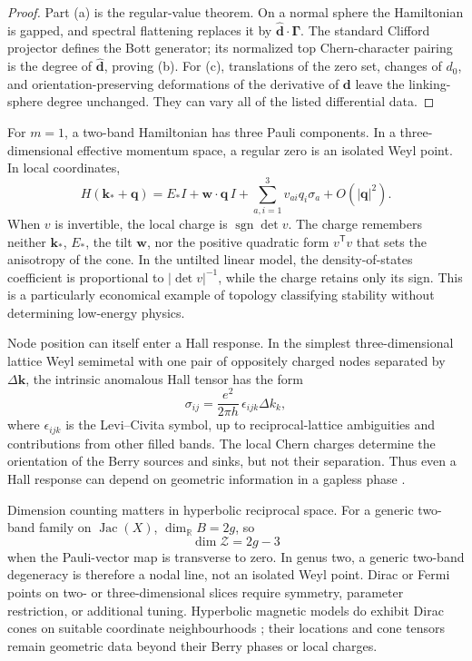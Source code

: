 \documentclass[11pt]{article}
\theoremstyle{definition}
\theoremstyle{remark}
\newcommand{\RR}{\mathbb R}
\newcommand{\Jac}{\operatorname{Jac}}
\begin{document}
\begin{proof}
Part \textup{(a)} is the regular-value theorem.  On a normal sphere the
Hamiltonian is gapped, and spectral flattening replaces it by
\(\widehat{\bm d}\cdot\bm\Gamma\).  The standard Clifford projector defines
the Bott generator; its normalized top Chern-character pairing is the degree
of \(\widehat{\bm d}\), proving \textup{(b)}.  For \textup{(c)}, translations
of the zero set, changes of \(d_0\), and orientation-preserving deformations
of the derivative of \(\bm d\) leave the linking-sphere degree unchanged.
They can vary all of the listed differential data.
\end{proof}

For \(m=1\), a two-band Hamiltonian has three Pauli components.  In a
three-dimensional effective momentum space, a regular zero is an isolated
Weyl point.  In local coordinates,
\[
 H(\bm k_*+\bm q)
   =E_*I+\bm w\cdot\bm q\,I
      +\sum_{a,i=1}^3v_{ai}q_i\sigma_a+O(|\bm q|^2).
 \tag{8.10}\label{eq:weyl-linearization}
\]
When \(v\) is invertible, the local charge is
\(\operatorname{sgn}\det v\).  The charge remembers neither
\(\bm k_*\), \(E_*\), the tilt \(\bm w\), nor the positive quadratic form
\(v^{\mathsf T}v\) that sets the anisotropy of the cone.  In the untilted
linear model, the density-of-states coefficient is proportional to
\(|\det v|^{-1}\), while the charge retains only its sign.  This is a
particularly economical example of topology classifying stability without
determining low-energy physics.

Node position can itself enter a Hall response.  In the simplest
three-dimensional lattice Weyl semimetal with one pair of oppositely charged
nodes separated by \(\Delta\bm k\), the intrinsic anomalous Hall tensor has
the form
\[
       \sigma_{ij}
         =\frac{e^2}{2\pi h}\,
            \epsilon_{ijk}\Delta k_k ,
       \tag{8.10a}\label{eq:weyl-hall-separation}
\]
where \(\epsilon_{ijk}\) is the Levi--Civita symbol, up to
reciprocal-lattice ambiguities and contributions from other filled bands.
The local Chern charges determine the orientation of the Berry
sources and sinks, but not their separation.  Thus even a Hall response can
depend on geometric information in a gapless phase
\cite{TummuruEtAl2024}.

Dimension counting matters in hyperbolic reciprocal space.  For a generic
two-band family on \(\Jac(X)\), \(\dim_\RR B=2g\), so
\[
                \dim\mathcal Z=2g-3
                \tag{8.11}\label{eq:two-band-nodal-dimension}
\]
when the Pauli-vector map is transverse to zero.  In genus two, a generic
two-band degeneracy is therefore a nodal line, not an isolated Weyl point.
Dirac or Fermi points on two- or three-dimensional slices require symmetry,
parameter restriction, or additional tuning.  Hyperbolic magnetic models
do exhibit Dirac cones on suitable coordinate neighbourhoods
\cite{IkedaAokiMatsuki}; their locations and cone tensors remain geometric
data beyond their Berry phases or local charges.
\end{document}
